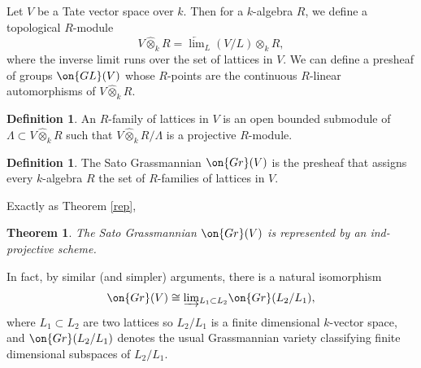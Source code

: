 \documentclass[]{pcmi}
\theoremstyle{plain}
\newtheorem{thm}[equation]{Theorem}
\theoremstyle{remark}
\theoremstyle{definition}
\newtheorem{dfn}[equation]{Definition}
\newcommand{\Gr}{{\on{Gr}}}
\newcommand{\GL}{{\on{GL}}}
\begin{document}
Let $V$ be a Tate vector space over $k$. Then for a $k$-algebra $R$, we define a topological $R$-module
\[V\hat\otimes_k R= \underleftarrow\lim_L (V/L)\otimes_kR,\]
where the inverse limit runs over the set of lattices in $V$. We can define a presheaf of groups $\GL(V)$ whose $R$-points are the continuous $R$-linear automorphisms of $V\hat\otimes_k R$.

\begin{dfn}An $R$-family of lattices in $V$ is an open bounded submodule of $\Lambda\subset V\hat\otimes_k R$ such that $V\hat\otimes_k R/\Lambda$ is a projective $R$-module.
\end{dfn}

\begin{dfn}
The Sato Grassmannian $\Gr(V)$ is the presheaf that assigns every $k$-algebra $R$ the set of $R$-families of lattices in $V$.
\end{dfn}

Exactly as Theorem \ref{rep},
\begin{thm}
The Sato Grassmannian $\Gr(V)$ is represented by an ind-projective scheme.
\end{thm}
In fact, by similar (and simpler) arguments, there is a natural isomorphism
$$\Gr(V)\cong \underrightarrow\lim_{L_1\subset L_2}\Gr(L_2/L_1),$$ 
where $L_1\subset L_2$ are two lattices so $L_2/L_1$ is a finite dimensional $k$-vector space, and $\Gr(L_2/L_1)$ denotes the usual Grassmannian variety classifying finite dimensional subspaces of $L_2/L_1$.
\end{document}
